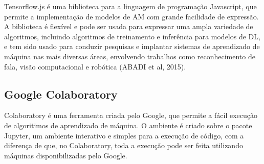 Tensorflow.js é uma biblioteca para a linguagem de programação Javascript, que permite a implementação de modelos de AM com grande facilidade de expressão. A biblioteca é flexível e pode ser usada para expressar uma ampla variedade de algoritmos, incluindo algoritmos de treinamento e inferência para modelos de DL, e tem sido usado para conduzir pesquisas e implantar sistemas de aprendizado de máquina nas mais diversas áreas, envolvendo trabalhos como reconhecimento de fala, visão computacional e robótica (ABADI et al, 2015). 

\subsection{Google Colaboratory}

Colaboratory é uma ferramenta criada pelo Google, que permite a fácil execução de algoritimos de aprendizado de máquina. O ambiente é criado sobre o pacote Jupyter, um ambiente interativo e simples para a execução de código, com a diferença de que, no Colaboratory, toda a execução pode ser feita utilizando máquinas disponibilizadas pelo Google.
